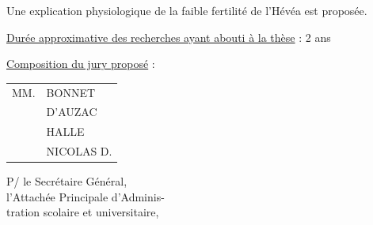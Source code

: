 Une explication physiologique de la faible fertilité
de l'Hévéa est proposée.

\uline{Durée approximative des recherches ayant abouti à la thèse} : 2 ans

\uline{Composition du jury proposé} : \begin{tabular}[t]{ll}
MM. & BONNET\\
& D'AUZAC\\
& HALLE\\
& NICOLAS D.
\end{tabular}

\begin{flushright}
P/ le Secrétaire Général,\\
l'Attachée Principale d'Adminis-\\
tration scolaire et universitaire,


\end{flushright}
